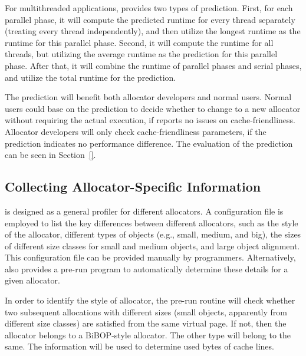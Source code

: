 For multithreaded applications, \MP{} provides two types of prediction. First, for each parallel phase, it will compute the predicted runtime for every thread separately (treating every thread independently), and then utilize the longest runtime as the runtime for this parallel phase. Second, it will compute the runtime for all threads, but utilizing the average runtime as the prediction for this parallel phase. After that, it will combine the runtime of parallel phases and serial phases, and utilize the total runtime for the prediction. 



The prediction will benefit both allocator developers and normal users. Normal users could base on the prediction to decide whether to change to a new allocator without requiring the actual execution, if \MP{} reports no issues on cache-friendliness. Allocator developers will only check cache-friendliness parameters, if the prediction indicates no performance difference. The evaluation of the prediction can be seen in Section~\ref{}. 

\subsection{Collecting Allocator-Specific Information}
\label{sec:understandingallocators}

\MP{} is designed as a general profiler for different allocators. A configuration file is employed to list the key differences between different allocators, such as the style of the allocator, different types of objects (e.g., small, medium, and big), the sizes of different size classes for small and medium objects, and large object alignment. This configuration file can be provided manually by programmers. Alternatively, \MP{} also provides a pre-run program to automatically determine these details for a given allocator.

In order to identify the style of allocator, the pre-run routine will check whether two subsequent allocations with different sizes (small objects, apparently from different size classes) are satisfied from the same virtual page. If not, then the allocator belongs to a BiBOP-style allocator. The other type will belong to the same. The information will be used to determine used bytes of cache lines. 

